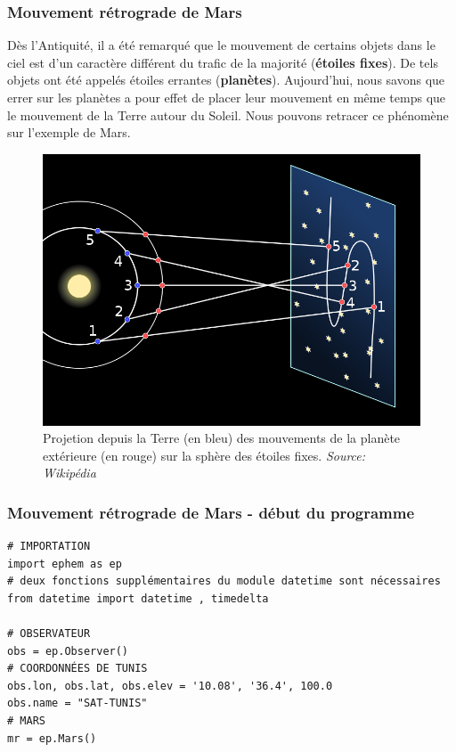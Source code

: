 \documentclass{beamer}
\begin{document}
\begin{frame}
\frametitle{Mouvement rétrograde de Mars}

Dès l'Antiquité, il a été remarqué que le mouvement de certains objets dans le ciel est d'un caractère différent du trafic de la majorité (\textbf{étoiles fixes}). De tels objets ont été appelés étoiles errantes (\textbf{planètes}). Aujourd'hui, nous savons que errer sur les planètes a pour effet de placer leur mouvement en même temps que le mouvement de la Terre autour du Soleil. Nous pouvons retracer ce phénomène sur l'exemple de Mars.

\begin{figure}[!ht]  %
  \centerline{\includegraphics[width=0.5\linewidth]{figs/retro_mars.png}}
  \caption{
  Projetion depuis la Terre (en bleu) des mouvements de la planète extérieure (en rouge) sur la sphère des étoiles fixes. \emph{Source: Wikipédia}
  }
\end{figure}
\end{frame}

\begin{frame}
\frametitle{Mouvement rétrograde de Mars - début du programme}

\begin{verbatim}
# IMPORTATION
import ephem as ep
# deux fonctions supplémentaires du module datetime sont nécessaires
from datetime import datetime , timedelta

# OBSERVATEUR
obs = ep.Observer()
# COORDONNÉES DE TUNIS
obs.lon, obs.lat, obs.elev = '10.08', '36.4', 100.0
obs.name = "SAT-TUNIS"
# MARS
mr = ep.Mars()
\end{verbatim}
\end{frame}
\end{document}
